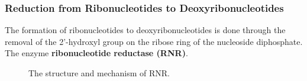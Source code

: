 \documentclass[../main.tex]{subfiles}
\begin{document}
\subsubsection{Reduction from Ribonucleotides to Deoxyribonucleotides}

The formation of ribonucleotides to deoxyribonucleotides is done through the removal of the 2'-hydroxyl group on the ribose ring of the nucleoside diphosphate. The enzyme \textbf{\gls{ribonucleotide reductase (RNR)}}.


\begin{figure}[H]
	\centering
	\hfill
	\caption{The structure and mechanism of RNR.}
\end{figure}
\end{document}
